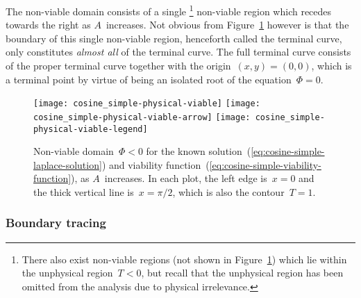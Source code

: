 The non-viable domain consists of a single%
\footnote{
  There also exist non-viable regions
  (not shown in Figure~\ref{fig:cosine_simple-physical-viable})
  which lie within the unphysical region~$T < 0$,
  but recall that the unphysical region has been omitted from the analysis
  due to physical irrelevance.
}
non-viable region which recedes towards the right as $A$~increases.
Not obvious from Figure~\ref{fig:cosine_simple-physical-viable} however
is that the boundary of this single non-viable region,
henceforth called the  terminal curve,
only constitutes \emph{almost all} of the terminal curve.
The full terminal curve consists of the proper terminal curve
together with the origin~$(x, y) = (0, 0)$,
which is a terminal point
by virtue of being an isolated root of the equation~$\Phi = 0$.

\begin{figure}
  \centering
  \texttt{[image: cosine\_simple-physical-viable]}
  \texttt{[image: cosine\_simple-physical-viable-arrow]}
  \texttt{[image: cosine\_simple-physical-viable-legend]}
  \caption{
    Non-viable domain~$\Phi < 0$
    for the known solution~(\ref{eq:cosine-simple-laplace-solution})
    and viability function~(\ref{eq:cosine-simple-viability-function}),
    as $A$~increases.
    In each plot, the left edge is~$x = 0$
    and the thick vertical line is~$x = \pi/2$,
    which is also the contour~$T = 1$.
  }
  \label{fig:cosine_simple-physical-viable}
\end{figure}

\subsubsection{Boundary tracing}
\label{sec:cartesian.cosine.simple.tracing}

